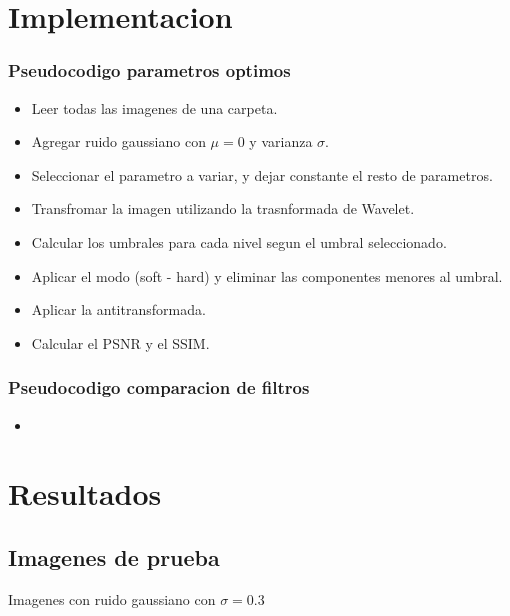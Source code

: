 \documentclass{beamer}
\begin{document}
  \section{Implementacion}

  \begin{frame}
    \frametitle{Pseudocodigo parametros optimos}
  
    \begin{itemize}
      \item Leer todas las imagenes de una carpeta.
      \item Agregar ruido gaussiano con $\mu=0$ y varianza $\sigma$.
      \item Seleccionar el parametro a variar, y dejar constante el resto de parametros.
      \item Transfromar la imagen utilizando la trasnformada de Wavelet.
      \item Calcular los umbrales para cada nivel segun el umbral seleccionado.
      \item Aplicar el modo (soft - hard) y eliminar las componentes menores al umbral.
      \item Aplicar la antitransformada.
      \item Calcular el PSNR y el SSIM.
    \end{itemize}
  
  \end{frame}

  \begin{frame}
    \frametitle{Pseudocodigo comparacion de filtros}
    \begin{itemize}
      \item 
    \end{itemize}
    
  
  \end{frame}

  \section{Resultados}

  \subsection{Imagenes de prueba}

  \begin{frame}
  
    Imagenes con ruido gaussiano con $\sigma=0.3$
  \end{frame}
\end{document}
